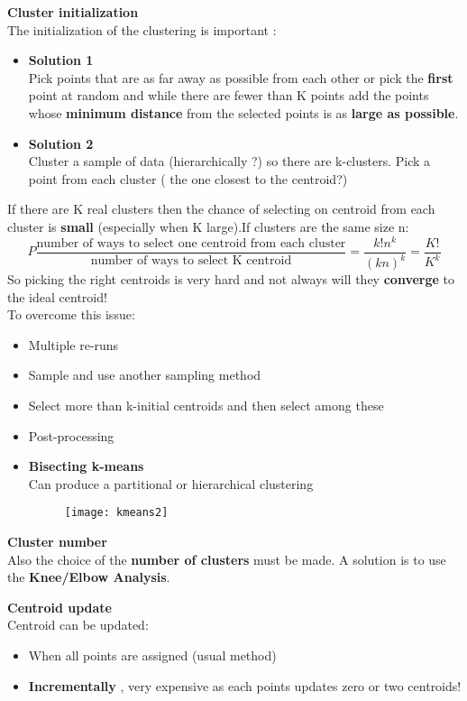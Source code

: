 \begin{description}
\item{\textbf{Cluster initialization}}\\
The initialization of the clustering is important :
\begin{itemize}
\item \textbf{Solution 1}\\
Pick points that are as far away as possible from each other or pick the \textbf{first} point at random and while there are fewer than K points add the points whose \textbf{minimum distance} from the selected points is as \textbf{large as possible}.
\item \textbf{Solution 2}\\
Cluster a sample of data (hierarchically ?) so there are k-clusters. Pick a point from each cluster ( the one closest to the centroid?)
\end{itemize}
If there are K real clusters then the chance of selecting	 on centroid from each cluster is \textbf{small} (especially when K large).If clusters are the same size n:
$$ P \frac{\text{number of ways to select one centroid from each cluster}}{\text{number of ways to select K centroid}} = \frac{k!n^k}{(kn)^k}= \frac{K!}{K^k}
$$
So picking the right centroids is very hard and not always will they \textbf{converge} to the ideal centroid!\\
To overcome this issue:
\begin{itemize}
\item Multiple re-runs
\item Sample and use another sampling method
\item Select more than k-initial centroids and then select among these
\item Post-processing
\item \textbf{Bisecting k-means}\\
Can produce a partitional or hierarchical clustering 
\begin{figure}[H]
  \centering
  \texttt{[image: kmeans2]}
\end{figure}

\end{itemize}

\item{\textbf{Cluster number}}\\
Also  the choice of the \textbf{number of clusters} must be made. A solution is to use the \textbf{Knee/Elbow Analysis}.

\item{\textbf{Centroid update}}\\
Centroid can be updated:
\begin{itemize}
\item When all points are assigned (usual method)
\item \textbf{Incrementally} , very expensive as each points updates zero or two centroids!
\end{itemize}
 

\end{description}
